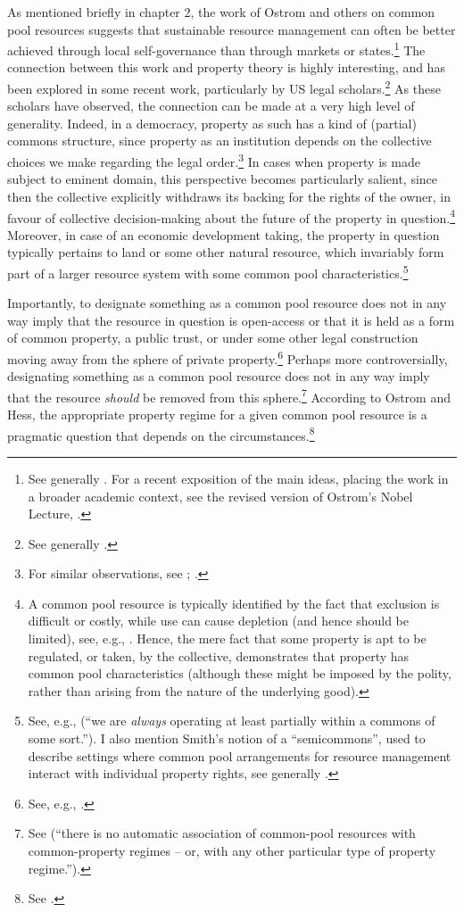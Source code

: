 As mentioned briefly in chapter 2, the work of Ostrom and others on common pool resources suggests that sustainable resource management can often be better achieved through local self-governance than through markets or states.\footnote{See generally \cite{ostrom90}. For a recent exposition of the main ideas, placing the work in a broader academic context, see the revised version of Ostrom's Nobel Lecture, \cite{ostrom10}.} The connection between this work and property theory is highly interesting, and has been explored in some recent work, particularly by US legal scholars.\footnote{See generally \cite{rose11,fennel11}.} As these scholars have observed, the connection can be made at a very high level of generality. Indeed, in a democracy, property as such has a kind of (partial) commons structure, since property as an institution depends on the collective choices we make regarding the legal order.\footnote{For similar observations, see \cite[51]{rose90}; \cite[577]{heller01}.} In cases when property is made subject to eminent domain, this perspective becomes particularly salient, since then the collective explicitly withdraws its backing for the rights of the owner, in favour of collective decision-making about the future of the property in question.\footnote{A common pool resource is typically identified by the fact that exclusion is difficult or costly, while use can cause depletion (and hence should be limited), see, e.g., \cite[57]{ostrom10b}. Hence, the mere fact that some property is apt to be regulated, or taken, by the collective, demonstrates that property has common pool characteristics (although these might be imposed by the polity, rather than arising from the nature of the underlying good).} Moreover, in case of an economic development taking, the property in question typically pertains to land or some other natural resource, which invariably form part of a larger resource system with some common pool characteristics.\footnote{See, e.g., \cite[16]{fennel11} (``we are {\it always} operating at least partially within a commons of some sort.''). I also mention Smith's notion of a ``semicommons'', used to describe settings where common pool arrangements for resource management interact with individual property rights, see generally \cite{smith00,smith02}.}

Importantly, to designate something as a common pool resource does not in any way imply that the resource in question is open-access or that it is held as a form of common property, a public trust, or under some other legal construction moving away from the sphere of private property.\footnote{See, e.g., \cite[58]{ostrom10b}.} Perhaps more controversially, designating something as a common pool resource does not in any way imply that the resource {\it should} be removed from this sphere.\footnote{See \cite[58]{ostrom10b} (``there is no automatic association of common-pool resources with common-property regimes -- or, with any other particular type of property regime.'').} According to Ostrom and Hess, the appropriate property regime for a given common pool resource is a pragmatic question that depends on the circumstances.\footnote{See \cite[58]{ostrom10b}.}

